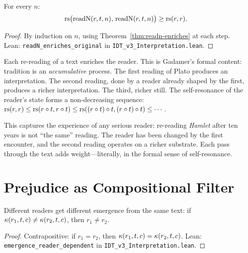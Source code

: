 \begin{theorem}
\label{thm:readn-enriches-original}
For every $n$:
\[
\mathrm{rs}\bigl(\mathrm{readN}(r, t, n),\, \mathrm{readN}(r, t, n)\bigr) \geq \mathrm{rs}(r, r).
\]
\end{theorem}

\begin{proof}
By induction on $n$, using Theorem~\ref{thm:readn-enriches} at each step.
Lean: \texttt{readN\_enriches\_original} in \texttt{IDT\_v3\_Interpretation.lean}.
\end{proof}

\begin{interpretation}
\label{interp:tradition}
Each re-reading of a text enriches the reader. This is Gadamer's formal content:
tradition is an \emph{accumulative} process. The first reading of Plato produces
an interpretation. The second reading, done by a reader already shaped by the
first, produces a richer interpretation. The third, richer still. The
self-resonance of the reader's state forms a non-decreasing sequence:
$\mathrm{rs}(r, r) \leq \mathrm{rs}(r \circ t, r \circ t) \leq \mathrm{rs}((r \circ t) \circ t, (r \circ t) \circ t) \leq \cdots$.

This captures the experience of any serious reader: re-reading \textit{Hamlet}
after ten years is not ``the same'' reading. The reader has been changed by the
first encounter, and the second reading operates on a richer substrate. Each
pass through the text adds weight---literally, in the formal sense of
self-resonance.
\end{interpretation}

\section{Prejudice as Compositional Filter}

\begin{theorem}
\label{thm:reader-dependent}
Different readers get different emergence from the same text:
if $\kappa(r_1, t, c) \neq \kappa(r_2, t, c)$, then $r_1 \neq r_2$.
\end{theorem}

\begin{proof}
Contrapositive: if $r_1 = r_2$, then $\kappa(r_1, t, c) = \kappa(r_2, t, c)$.
Lean: \texttt{emergence\_reader\_dependent} in \texttt{IDT\_v3\_Interpretation.lean}.
\end{proof}

